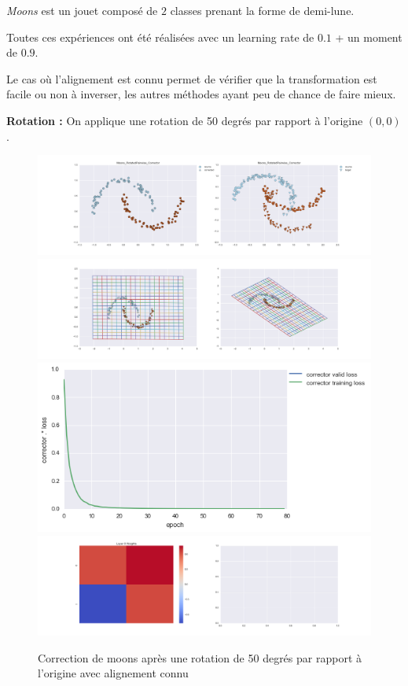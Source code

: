 

\emph{Moons} est un jouet composé de $2$ classes prenant la forme de demi-lune.

Toutes ces expériences ont été réalisées avec un learning rate de $0.1$ + un moment de $0.9$.

Le cas où l'alignement est connu permet de vérifier que la transformation est facile ou non 
à inverser, les autres méthodes ayant peu de chance de faire mieux.


{\Large \textbf{Rotation :}} On applique une rotation de 50 degrés par rapport à l'origine $(0,0)$.

\begin{figure}[H] %
\centering
\includegraphics[width=\linewidth]{fig/24-05-2016/moons/Moons_RotatedPairwise_Corrector-DATA.png}
\includegraphics[width=\linewidth]{fig/24-05-2016/moons/Moons_RotatedPairwise_Corrector-GridCheck.png}
\includegraphics[width=0.45\linewidth]{fig/24-05-2016/moons/Moons_RotatedPairwise_Corrector-Learning_curve.png}
\includegraphics[width=\linewidth]{fig/24-05-2016/moons/Moons_RotatedPairwise_Corrector-W.png}
\caption{Correction de moons après une rotation de 50 degrés par rapport à l'origine avec alignement connu}
\label{fig:recap-moons-rot-pairwise}
\end{figure}


